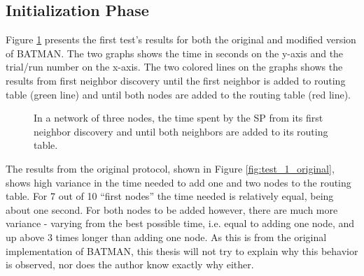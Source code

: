 \subsection{Initialization Phase}
Figure \ref{fig:results_test_1} presents the first test's results for both the
original and modified version of BATMAN. The two graphs shows the time in
seconds on the y-axis and the trial/run number on the x-axis. The two colored
lines on the graphs shows the results from first neighbor discovery until the
first neighbor is added to routing table (green line) and until both nodes are
added to the routing table (red line).

\begin{figure}[h]
	\centering
	\caption{In a network of three nodes, the time spent by the \ac{SP} from its first neighbor discovery and until both neighbors are added to its routing table.}
	\label{fig:results_test_1}
\end{figure}

The results from the original protocol, shown in Figure
\ref{fig:test_1_original}, shows high variance in the time needed to add one and
two nodes to the routing table. For 7 out of 10 ``first nodes'' the time needed
is relatively equal, being about one second. For both nodes to be added however,
there are much more variance - varying from the best possible time, i.e. equal
to adding one node, and up above 3 times longer than adding one node. As this is
from the original implementation of BATMAN, this thesis will not try to explain
why this behavior is observed, nor does the author know exactly why either.

